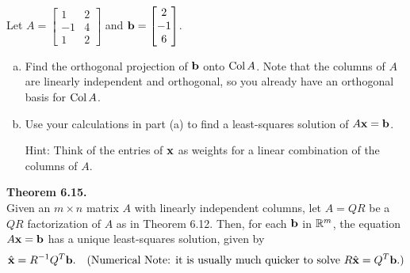 \begin{exercise} %
	Let $ A = \begin{bmatrix}1&2\\-1&4\\1&2\end{bmatrix} $ and $ \boldsymbol{\mathbf{b}} = \begin{bmatrix}2\\-1\\6\end{bmatrix} $.
	\begin{enumerate}[(a)]
		\item Find the orthogonal projection of $\boldsymbol{\mathbf{b}}$ onto $\operatorname{Col} A$. Note that the columns of $A$ are linearly independent and orthogonal, so you already have an orthogonal basis for $\operatorname{Col} A$.
		\vspace{1.75in}
		\item Use your calculations in part (a) to find a least-squares solution of $A\boldsymbol{\mathbf{x}}=\boldsymbol{\mathbf{b}}$. \par Hint: Think of the entries of $\boldsymbol{\mathbf{x}}$ as weights for a linear combination of the columns of $A$.
		\vspace{4em}
	\end{enumerate}
\end{exercise}


\begin{boxthm}
	\textbf{Theorem 6.15.} \\
	Given an $m\times n$ matrix $A$ with linearly independent columns, let $A=QR$ be a $QR$ factorization of $A$ as in Theorem 6.12. Then, for each $\boldsymbol{\mathbf{b}}$ in $\mathbb{R}^m$, the equation $A\boldsymbol{\mathbf{x}}=\boldsymbol{\mathbf{b}}$ has a unique least-squares solution, given by
	\vspace{-1em}
	\begin{align*}
	\hat{\boldsymbol{\mathbf{x}}} &= R^{-1}Q^T\boldsymbol{\mathbf{b}}. &
	(\text{Numerical Note: it is usually much quicker to solve } R\hat{\boldsymbol{\mathbf{x}}} = Q^T\boldsymbol{\mathbf{b}}.)
	\end{align*}
\end{boxthm}


